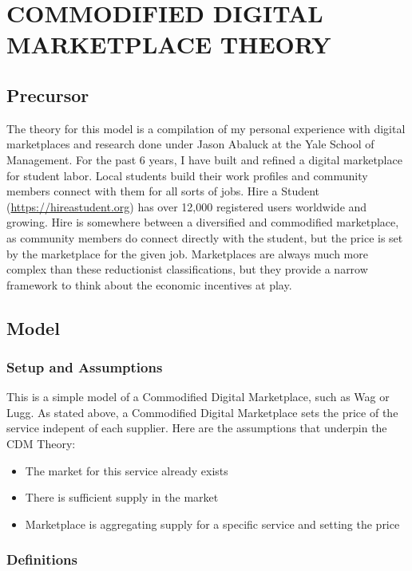 \chapter{COMMODIFIED DIGITAL MARKETPLACE THEORY}
\section{Precursor}

The theory for this model is a compilation of my personal experience with digital marketplaces and research done under Jason Abaluck at the Yale School of Management. For the past 6 years, I have built and refined a digital marketplace for student labor. Local students build their work profiles and community members connect with them for all sorts of jobs. Hire a Student (\url{https://hireastudent.org}) has over 12,000 registered users worldwide and growing. Hire is somewhere between a diversified and commodified marketplace, as community members do connect directly with the student, but the price is set by the marketplace for the given job. Marketplaces are always much more complex than these reductionist classifications, but they provide a narrow framework to think about the economic incentives at play.

\section{Model}

\subsection{Setup and Assumptions}

This is a simple model of a Commodified Digital Marketplace, such as Wag or Lugg. As stated above, a Commodified Digital Marketplace sets the price of the service indepent of each supplier. Here are the assumptions that underpin the CDM Theory:

\begin{itemize}
  \item The market for this service already exists
  \item There is sufficient supply in the market
  \item Marketplace is aggregating supply for a specific service and setting the price
\end{itemize}

\subsection{Definitions}

